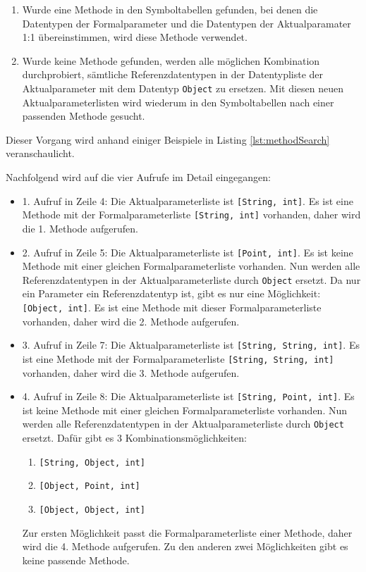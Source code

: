 \begin{enumerate}
    \item Wurde eine Methode in den Symboltabellen gefunden, bei denen die Datentypen der Formalparameter und die Datentypen der Aktualparamater 1:1 übereinstimmen, wird diese Methode verwendet.
    \item Wurde keine Methode gefunden, werden alle möglichen Kombination durchprobiert, sämtliche Referenzdatentypen in der Datentypliste der Aktualparameter mit dem Datentyp \lstinline{Object} zu ersetzen. Mit diesen neuen Aktualparameterlisten wird wiederum in den Symboltabellen nach einer passenden Methode gesucht.
\end{enumerate}

Dieser Vorgang wird anhand einiger Beispiele in Listing \ref{lst:methodSearch} veranschaulicht.



Nachfolgend wird auf die vier Aufrufe im Detail eingegangen:
\begin{itemize}
    \item 1. Aufruf in Zeile 4: Die Aktualparameterliste ist \lstinline{[String, int]}. Es ist eine Methode mit der Formalparameterliste \lstinline{[String, int]} vorhanden, daher wird die 1. Methode aufgerufen.
    \item 2. Aufruf in Zeile 5: Die Aktualparameterliste ist \lstinline{[Point, int]}. Es ist keine Methode mit einer gleichen Formalparameterliste vorhanden. Nun werden alle Referenzdatentypen in der Aktualparameterliste durch \lstinline{Object} ersetzt. Da nur ein Parameter ein Referenzdatentyp ist, gibt es nur eine Möglichkeit: \lstinline{[Object, int]}. Es ist eine Methode mit dieser Formalparameterliste vorhanden, daher wird die 2. Methode aufgerufen.
    \item 3. Aufruf in Zeile 7: Die Aktualparameterliste ist \lstinline{[String, String, int]}. Es ist eine Methode mit der Formalparameterliste \lstinline{[String, String, int]} vorhanden, daher wird die 3. Methode aufgerufen.
    \item 4. Aufruf in Zeile 8: Die Aktualparameterliste ist \lstinline{[String, Point, int]}. Es ist keine Methode mit einer gleichen Formalparameterliste vorhanden. Nun werden alle Referenzdatentypen in der Aktualparameterliste durch \lstinline{Object} ersetzt. Dafür gibt es 3 Kombinationsmöglichkeiten:
    \begin{enumerate}
        \item \lstinline{[String, Object, int]}
        \item \lstinline{[Object, Point, int]}
        \item \lstinline{[Object, Object, int]}
    \end{enumerate}
    Zur ersten Möglichkeit passt die Formalparameterliste einer Methode, daher wird die 4. Methode aufgerufen. Zu den anderen zwei Möglichkeiten gibt es keine passende Methode.
\end{itemize}

